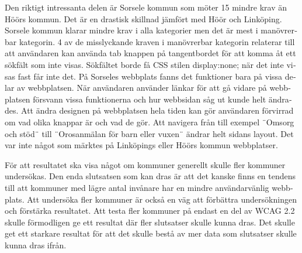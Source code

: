 \documentclass[11p]{article}
\begin{document}
\begin{otherlanguage}{swedish}
    Den riktigt intressanta delen är Sorsele kommun som möter 15 mindre krav än Höörs kommun.
    Det är en drastisk skillnad jämfört med Höör och Linköping.
    Sorsele kommun klarar mindre krav i alla kategorier men det är mest i manövrerbar kategorin.
    4 av de misslyckande kraven i manövrerbar kategorin relaterar till att användaren kan använda tab knappen på tangentbordet för att komma åt ett sökfält som inte visas.
    Sökfältet borde få CSS stilen display:none; när det inte visas fast får inte det.
    På Sorseles webbplats fanns det funktioner bara på vissa delar av webbplatsen.
    När användaren använder länkar för att gå vidare på webbplatsen försvann vissa funktionerna och hur webbsidan såg ut kunde helt ändrades.
    Att ändra designen på webbplatsen hela tiden kan gör användaren förvirrad om vad olika knappar är och vad de gör.
    Att navigera från till exempel ¨Omsorg och stöd¨ till ¨Orosanmälan för barn eller vuxen¨ ändrar helt sidans layout.
    Det var inte något som märktes på Linköpings eller Höörs kommun webbplatser.


    För att resultatet ska visa något om kommuner generellt skulle fler kommuner undersökas.
    Den enda slutsatsen som kan dras är att det kanske finns en tendens till att kommuner med lägre antal invånare har en mindre användarvänlig webbplats.
    Att undersöka fler kommuner är också en väg att förbättra undersökningen och förstärka resultatet.
    Att testa fler kommuner på endast en del av WCAG 2.2 skulle förmodligen ge ett resultat där fler slutsatser skulle kunna dras.
    Det skulle get ett starkare resultat för att det skulle bestå av mer data som slutsatser skulle kunna dras ifrån.


\end{otherlanguage}
\end{document}
